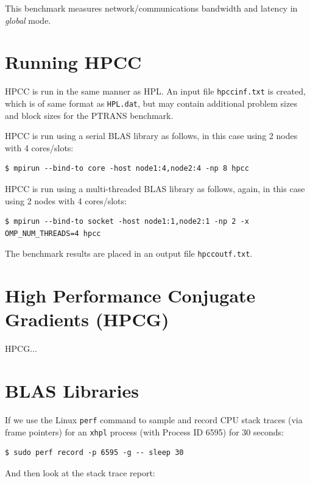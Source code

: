 \documentclass{report}
\begin{document}
This benchmark measures network/communications bandwidth and latency in \emph{global} mode.


%
%
\section{Running HPCC}

HPCC is run in the same manner as HPL. An input file \verb|hpccinf.txt| is created, which is of same format as \verb|HPL.dat|, but may contain additional problem sizes and block sizes for the PTRANS benchmark.

HPCC is run using a serial BLAS library as follows, in this case using 2 nodes with 4 cores/slots:

\lstset{style=type}
\begin{lstlisting}
$ mpirun --bind-to core -host node1:4,node2:4 -np 8 hpcc
\end{lstlisting}

HPCC is run using a multi-threaded BLAS library as follows, again, in this case using 2 nodes with 4 cores/slots:

\lstset{style=type}
\begin{lstlisting}
$ mpirun --bind-to socket -host node1:1,node2:1 -np 2 -x OMP_NUM_THREADS=4 hpcc
\end{lstlisting}

The benchmark results are placed in an output file \verb|hpccoutf.txt|.  



%
%
\section{High Performance Conjugate Gradients (HPCG)}

HPCG...

%
%
\section{BLAS Libraries}

If we use the Linux \verb|perf| command to sample and record CPU stack traces (via frame pointers) for an \verb|xhpl| process (with Process ID 6595) for 30 seconds:

\lstset{style=type}
\begin{lstlisting}
$ sudo perf record -p 6595 -g -- sleep 30
\end{lstlisting}

And then look at the stack trace report: 
\end{document}
